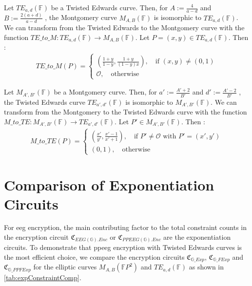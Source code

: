 \newpage
\begin{theorem}
    \label{theorem:TEMIsomorphism}
    Let $TE_{a,d}(\mathbb{F})$ be a Twisted Edwards curve.
    Then, for $A:=\frac{4}{a-d}$ and $B:=\frac{2(a+d)}{a-d}$ \cite{least_authority_moonmath_2024}, the Montgomery curve $M_{A,B}(\mathbb{F})$ is isomorphic to $TE_{a,d}(\mathbb{F})$.
    We can transform from the Twisted Edwards to the Montgomery curve with the function $TE\_to\_M:TE_{a,d}(\mathbb{F})\to M_{A,B}(\mathbb{F})$. 
    Let $P=(x,y)\in TE_{a,d}(\mathbb{F})$. Then \cite{costello_montgomery_2018}:
    \begin{align*}
        TE\_to\_M(P)=\begin{cases}
            \left(\frac{1+y}{1-y}, \frac{1+y}{(1-y)x}\right),\quad\text{if } (x,y)\neq (0,1)\\
            \mathcal{O},\quad\text{otherwise}
        \end{cases}
    \end{align*}

    Let $M_{A',B'}(\mathbb{F})$ be a Montgomery curve.
    Then, for $a':=\frac{A'+2}{B'}$ and $d':=\frac{A'-2}{B'}$ \cite{least_authority_moonmath_2024}, the Twisted Edwards curve $TE_{a',d'}(\mathbb{F})$ is isomorphic to $M_{A',B'}(\mathbb{F})$.
    We can transform from the Montgomery to the Twisted Edwards curve with the function $M\_to\_TE:M_{A',B'}(\mathbb{F})\to TE_{a',d'}(\mathbb{F})$. 
    Let $P'\in M_{A',B'}(\mathbb{F})$. Then \cite{costello_montgomery_2018}:
    \begin{align*}
        M\_to\_TE(P)=\begin{cases}
            \left(\frac{x'}{y'}, \frac{x'-1}{x'+1}\right),\quad\text{if } P'\neq\mathcal{O} \text{ with } P'=(x',y')\\
            (0,1),\quad\text{otherwise}
        \end{cases}
    \end{align*}
\end{theorem}

\section{Comparison of Exponentiation Circuits}

For \gls{eeg} encryption, the main contributing factor to the total constraint counts in the encryption circuit $\mathfrak{C}_{EEG(\mathbb{G}).Enc}$ or $\mathfrak{C}_{PPEEG(\mathbb{G}).Enc}$ are the exponentiation circuits.
To demonstrate that \gls{ppeeg} encryption with Twisted Edwards curves is the most efficient choice, we compare the encryption circuits $\mathfrak{C}_{\mathbb{G}\_Exp}$, $\mathfrak{C}_{\mathbb{G}\_FExp}$ and $\mathfrak{C}_{\mathbb{G}\_PPFExp}$ for the elliptic curves $M_{A,B}(\mathbb{F}P^2)$ and $TE_{a,d}(\mathbb{F})$ as shown in \cref{tab:expConstraintComp}.

